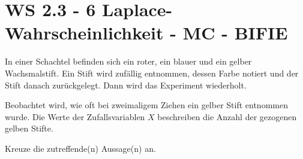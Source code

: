 \section{WS 2.3 - 6 Laplace-Wahrscheinlichkeit - MC - BIFIE}

\begin{beispiel}[WS 2.3]{1}
In einer Schachtel befinden sich ein roter, ein blauer und ein gelber Wachsmalstift. Ein Stift wird zufällig entnommen, dessen Farbe notiert und der Stift danach zurückgelegt. Dann wird das
Experiment wiederholt. \leer

Beobachtet wird, wie oft bei zweimaligem Ziehen ein gelber Stift entnommen wurde. Die Werte der Zufallsvariablen $X$ beschreiben die Anzahl der gezogenen gelben Stifte.\leer

Kreuze die zutreffende(n) Aussage(n) an.

\end{beispiel}
